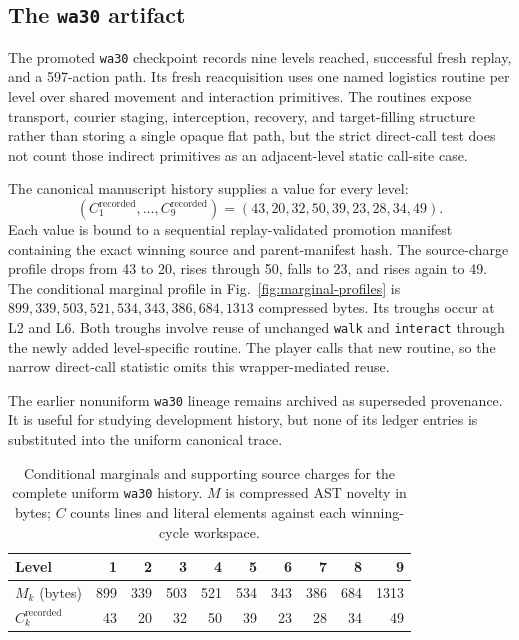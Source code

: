 \documentclass[11pt]{article}
\theoremstyle{definition}
\theoremstyle{remark}
\begin{document}
\subsection{The \texttt{wa30} artifact}
The promoted \texttt{wa30} checkpoint records nine levels reached, successful fresh
replay, and a 597-action path. Its fresh reacquisition uses one named logistics routine
per level over shared movement and interaction primitives. The routines expose
transport, courier staging, interception, recovery, and target-filling structure rather
than storing a single opaque flat path, but the strict direct-call test does not count
those indirect primitives as an adjacent-level static call-site case.

The canonical manuscript history supplies a value for every level:
\begin{equation}
  (C_1^{\mathrm{recorded}},\ldots,C_9^{\mathrm{recorded}})=(43,20,32,50,39,23,28,34,49).
  \label{eq:wa30-ledger}
\end{equation}
Each value is bound to a sequential replay-validated promotion manifest containing the
exact winning source and parent-manifest hash. The source-charge profile drops from 43 to 20, rises
through 50, falls to 23, and rises again to 49. The conditional marginal profile in
Fig.~\ref{fig:marginal-profiles} is
\(899,339,503,521,534,343,386,684,1313\) compressed bytes. Its troughs occur at L2
and L6. Both troughs involve reuse of unchanged \texttt{walk} and \texttt{interact}
through the newly added level-specific routine. The player calls that new routine,
so the narrow direct-call statistic omits this wrapper-mediated reuse.

The earlier nonuniform \texttt{wa30} lineage remains archived as superseded provenance.
It is useful for studying development history, but none of its ledger entries is
substituted into the uniform canonical trace.

\begin{table}[t]
\centering
\small
\begin{tabular}{@{}lrrrrrrrrr@{}}
\toprule
Level & 1 & 2 & 3 & 4 & 5 & 6 & 7 & 8 & 9 \\
\midrule
$M_k$ (bytes) & 899 & 339 & 503 & 521 & 534 & 343 & 386 & 684 & 1313 \\
$C_k^{\mathrm{recorded}}$ & 43 & 20 & 32 & 50 & 39 & 23 & 28 & 34 & 49 \\
\bottomrule
\end{tabular}
\caption{Conditional marginals and supporting source charges for the complete
uniform \texttt{wa30} history. $M$ is compressed AST novelty in bytes; $C$ counts
lines and literal elements against each winning-cycle workspace.}
\label{tab:wa30-ledger}
\end{table}
\end{document}
